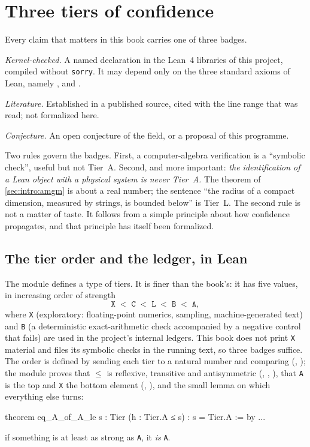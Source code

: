 \section{Three tiers of confidence}\label{sec:intro:tiers}

Every claim that matters in this book carries one of three badges.
\begin{description}[leftmargin=2.2em,labelwidth=1.6em,itemsep=2pt,font=\normalfont]
\item[\TA] \emph{Kernel-checked.} A named declaration in the Lean~4 libraries of this
project, compiled without \texttt{sorry}. It may depend only on the three standard axioms of
Lean, namely ,  and .
\item[\TL] \emph{Literature.} Established in a published source, cited with the line range
that was read; not formalized here.
\item[\TC] \emph{Conjecture.} An open conjecture of the field, or a proposal of this
programme.
\end{description}
Two rules govern the badges. First, a computer-algebra verification is a ``symbolic check'',
useful but not Tier~A. Second, and more important: \emph{the identification of a Lean object
with a physical system is never Tier~A.} The theorem of \cref{sec:intro:amgm} is about a real
number; the sentence ``the radius of a compact dimension, measured by strings, is bounded
below'' is Tier~L. The second rule is not a matter of taste. It follows from a simple
principle about how confidence propagates, and that principle has itself been formalized.

\subsection{The tier order and the ledger, in Lean}

The module  defines a type of tiers. It is
finer than the book's: it has five values, in increasing order of strength
\[
  \texttt{X}\;<\;\texttt{C}\;<\;\texttt{L}\;<\;\texttt{B}\;<\;\texttt{A},
\]
where \texttt{X} (exploratory: floating-point numerics, sampling, machine-generated text) and
\texttt{B} (a deterministic exact-arithmetic check accompanied by a negative control that
fails) are used in the project's internal ledgers. This book does not print \texttt{X}
material and files its symbolic checks in the running text, so three badges suffice. The
order is defined by sending each tier to a natural number and comparing
(, ); the module proves that $\le$ is reflexive, transitive and
antisymmetric (, , ), that \texttt{A} is
the top and \texttt{X} the bottom element (,
), and the small lemma on which everything else turns:
\begin{leancode}
theorem eq_A_of_A_le {s : Tier} (h : Tier.A ≤ s) : s = Tier.A := by ...
\end{leancode}
if something is at least as strong as \texttt{A}, it \emph{is} \texttt{A}.

